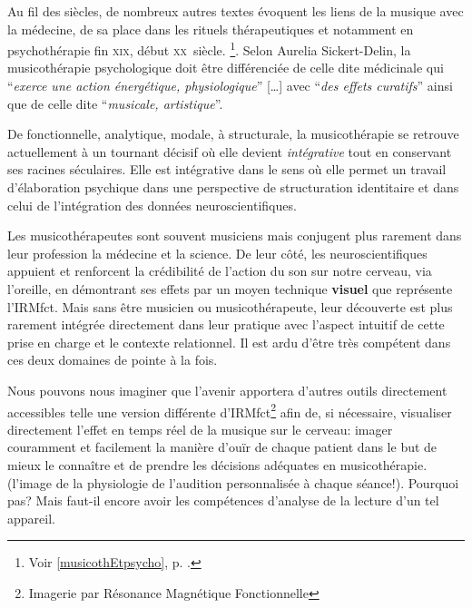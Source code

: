  Au fil des siècles, de nombreux autres 
textes évoquent les liens de la musique avec la médecine, de sa place dans les 
rituels thérapeutiques et notamment en psychothérapie fin \textsc{xix}\ieme, 
début \textsc{xx}\ieme\ siècle. \footnote{Voir \ref{musicothEtpsycho},
  p. \pageref{musicothEtpsycho}.}.
Selon Aurelia Sickert-Delin, la musicothérapie 
psychologique doit être différenciée de celle dite médicinale qui 
\enquote{\emph{exerce une action 
énergétique, physiologique}} [\dots] avec \enquote{\emph{des effets curatifs}}  
ainsi que de celle dite \enquote{\emph{musicale, artistique}}. 

 De fonctionnelle, analytique, mo\-da\-le,  à 
struc\-tu\-rale, la musicothérapie se retrouve actuellement 
 à un tournant décisif où elle devient 
 \emph{intégrative} tout en conservant ses racines séculaires. Elle est 
intégrative dans le sens où elle permet un travail d'élaboration psychique dans une perspective de structuration identitaire \autocite[ch. III, p. 53, 
105]{vrait_musicotherapie_2018} et dans celui de l'intégration des données 
neuroscientifiques.
 


 
 
Les musicothérapeutes sont souvent musiciens mais conjugent plus
rarement dans leur profession la
médecine et la science. De leur côté, les neuroscientifiques appuient
et renforcent la crédibilité de l'action du son sur notre cerveau, via
l'oreille, en démontrant ses effets par un moyen technique
\textbf{visuel} que représente l'IRMfct. Mais sans être musicien ou
musicothérapeute, leur découverte est plus rarement intégrée
directement dans leur pratique avec l'aspect intuitif de cette prise
en charge et le contexte
relationnel. Il est ardu d'être très compétent dans ces deux domaines
de pointe à
la fois.

Nous pouvons nous imaginer que l'avenir apportera d'autres outils
directement accessibles telle une version différente d'IRMfct\footnote{Imagerie par Résonance Magnétique
   Fonctionnelle} afin
 de, si nécessaire, visualiser directement l'effet en temps réel de la musique sur le
 cerveau:  imager couramment et facilement la manière d'ouïr de chaque
 patient dans le but de mieux le connaître et de 
 prendre les décisions adéquates en musicothérapie. (l'image de la
 physiologie de l'audition personnalisée à chaque séance!). Pourquoi
 pas?  Mais faut-il encore avoir 
 les compétences d'analyse de la lecture d'un tel appareil.
 
